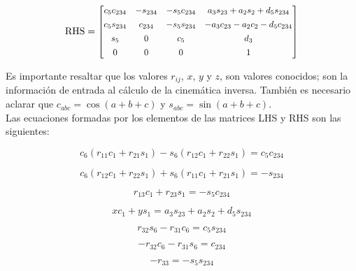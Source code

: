 \documentclass{article}
\begin{document}
\begin{equation*}
\text{RHS} = \scalebox{0.9}{\ensuremath{%
\begin{bmatrix}
c_5 c_{234} & - s_{234} & - s_5 c_{234} & a_3 s_{23} + a_2 s_2 + d_5 s_{234} \\[4pt]
c_5 s_{234} & c_{234} & - s_5 s_{234} & - a_3 c_{23} - a_2 c_2 - d_5 c_{234} \\[4pt]
s_5 & 0 & c_5 & d_3 \\[4pt]
0 & 0 & 0 & 1
\end{bmatrix}}}
\end{equation*}

Es importante resaltar que los valores $r_{ij}$, $x$, $y$ y $z$, son valores conocidos; son la información de entrada al cálculo de la cinemática inversa. También es necesario aclarar que $c_{abc}=\cos(a+b+c)$ y $s_{abc}=\sin(a+b+c)$.\\

Las ecuaciones formadas por los elementos de las matrices LHS y RHS son las siguientes:

\begin{equation}
c_6 (r_{11}c_1 + r_{21}s_1) - s_6 (r_{12}c_1 + r_{22}s_1) = c_5 c_{234}
\label{LHS_RHS_1}
\end{equation}

\begin{equation}
c_6 (r_{12}c_1 + r_{22}s_1) + s_6 (r_{11}c_1 + r_{21}s_1) = - s_{234}
\label{LHS_RHS_2}
\end{equation}

\begin{equation}
r_{13}c_1 + r_{23}s_1 = - s_5 c_{234}
\label{LHS_RHS_3}
\end{equation}

\begin{equation}
x c_1 + y s_1 = a_3 s_{23} + a_2 s_2 + d_5 s_{234}
\label{LHS_RHS_4}
\end{equation}

\begin{equation}
r_{32}s_6 - r_{31}c_6 = c_5 s_{234}
\label{LHS_RHS_5}
\end{equation}

\begin{equation}
- r_{32}c_6 - r_{31}s_6 = c_{234}
\label{LHS_RHS_6}
\end{equation}

\begin{equation}
- r_{33} = - s_5 s_{234}
\label{LHS_RHS_7}
\end{equation}
\end{document}
